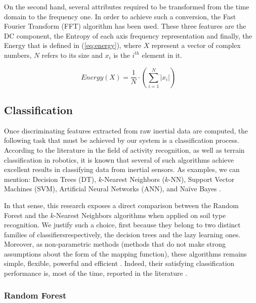 \documentclass[conference]{IEEEtran}
\begin{document}
On the second hand, several attributes required to be transformed from the time domain to the frequency one. In order to achieve such a conversion, the Fast Fourier Transform (FFT) algorithm has been used. These three features are the DC component, the Entropy of each axis frequency representation and finally, the Energy that is defined in (\ref{eq:energy}), where $X$ represent a vector of complex numbers, $N$ refers to its size and $x_i$ is the $i^{th}$ element in it.

\begin{equation}
	\label{eq:energy}
	Energy(X) = \frac{1}{N}\cdot\left(\sum_{i=1}^{N}|x_i|\right)
\end{equation}

\subsection{Classification}

Once discriminating features extracted from raw inertial data are computed, the following task that must be achieved by our system is a classification process. According to the literature in the field of activity recognition, as well as terrain classification in robotics, it is known that several of such algorithms achieve excellent results in classifying data from inertial sensors. As examples, we can mention: Decision Trees (DT), $k$-Nearest Neighbors ($k$-NN), Support Vector Machines (SVM), Artificial Neural Networks (ANN), and Na\"ive Bayes \cite{Tuncel2009, Kertesz2016, Weiss2007, Kim2010, Vail2004, Hoffmann2014, Bibuli2007}. 

In that sense, this research exposes a direct comparison between the Random Forest and the $k$-Nearest Neighbors algorithms when applied on soil type recognition. We justify such a choice, first because they belong to two distinct families of classifiers\textemdash respectively, the decision trees and the lazy learning ones. Moreover, as non-parametric methods (methods that do not make strong assumptions about the form of the mapping function), these algorithms remains simple, flexible, powerful and efficient \cite{Russell2010}. Indeed, their satisfying classification performance is, most of the time, reported in the literature \cite{Kertesz2016, Vail2004}.

\subsubsection{Random Forest}
\end{document}
